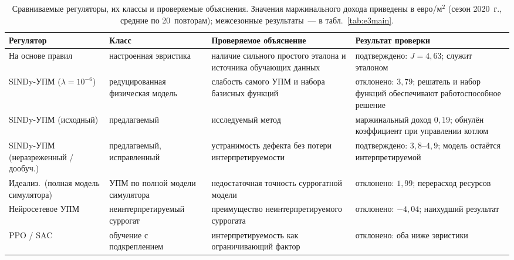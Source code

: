 \documentclass[12pt,a4paper,leqno]{article}
\begin{document}
\begin{table}[t]
\centering
\caption{Сравниваемые регуляторы, их классы и проверяемые объяснения. Значения
маржинального дохода приведены в евро/м$^2$ (сезон 2020~г., средние по 20~повторам); межсезонные
результаты~--- в табл.~\ref{tab:e3main}.}
\label{tab:controllers}
\small
\setlength{\extrarowheight}{2pt}
\setlength{\tabcolsep}{5pt}
\begin{tabular}{@{}p{2.7cm}p{2.7cm}p{4.6cm}p{3.9cm}@{}}
\toprule
Регулятор & Класс & Проверяемое объяснение & Результат проверки \\
\midrule
На основе правил & настроенная эвристика & наличие сильного простого эталона и
источника обучающих данных & подтверждено: $J=4{,}63$; служит эталоном \\
\addlinespace[3pt]
SINDy-УПМ ($\lambda=10^{-6}$) & редуцированная физическая модель & слабость самого УПМ и набора
базисных функций & отклонено: $3{,}79$; решатель и набор функций обеспечивают работоспособное решение \\
\addlinespace[3pt]
SINDy-УПМ (исходный) & предлагаемый & исследуемый метод & маржинальный доход $0{,}19$; обнулён
коэффициент при управлении котлом \\
\addlinespace[3pt]
SINDy-УПМ (неразреженный / дообуч.) & предлагаемый, исправленный & устранимость дефекта без
потери интерпретируемости & подтверждено: $3{,}8$--$4{,}9$; модель остаётся интерпретируемой \\
\addlinespace[3pt]
Идеализ.\ (полная модель симулятора) & УПМ по полной модели симулятора & недостаточная точность
суррогатной модели & отклонено: $1{,}99$; перерасход ресурсов \\
\addlinespace[3pt]
Нейросетевое УПМ & неинтерпретируемый суррогат & преимущество неинтерпретируемого суррогата &
отклонено: $-4{,}04$; наихудший результат \\
\addlinespace[3pt]
PPO / SAC & обучение с подкреплением & интерпретируемость как ограничивающий фактор &
отклонено: оба ниже эвристики \\
\bottomrule
\end{tabular}
\end{table}
\end{document}

